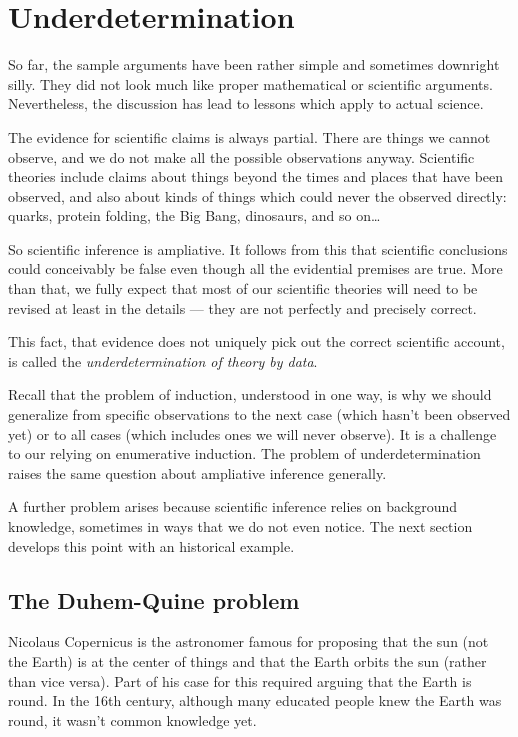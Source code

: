 \documentclass[]{article}
\begin{document}
\section{Underdetermination}

So far, the sample arguments have been rather simple and sometimes downright silly. They did not look much like proper mathematical or scientific arguments. Nevertheless, the discussion has lead to lessons which apply to actual science.

The evidence for scientific claims is always partial. There are things we cannot observe, and we do not make all the possible observations anyway. Scientific theories include claims about things beyond the times and places that have been observed, and also about kinds of things which could never the observed directly: quarks, protein folding, the Big Bang, dinosaurs, and so on\ldots

So scientific inference is ampliative. It follows from this that scientific conclusions could conceivably be false even though all the evidential premises are true. More than that, we fully expect that most of our scientific theories will need to be revised at least in the details --- they are not perfectly and precisely correct.

This fact, that evidence does not uniquely pick out the correct scientific account, is called the \emph{underdetermination of theory by data}.

Recall that the problem of induction, understood in one way, is why we should generalize from specific observations to the next case (which hasn't been observed yet) or to all cases (which includes ones we will never observe). It is a challenge to our relying on enumerative induction. The problem of underdetermination raises the same question about ampliative inference generally.

A further problem arises because scientific inference relies on background knowledge, sometimes in ways that we do not even notice. The next section develops this point with an historical example.

\subsection{The Duhem-Quine problem}

Nicolaus Copernicus is the astronomer famous for proposing that the sun (not the Earth) is at the center of things and that the Earth orbits the sun (rather than vice versa). Part of his case for this required arguing that the Earth is round. In the 16th century, although many educated people knew the Earth was round, it wasn't common knowledge yet.
\end{document}
